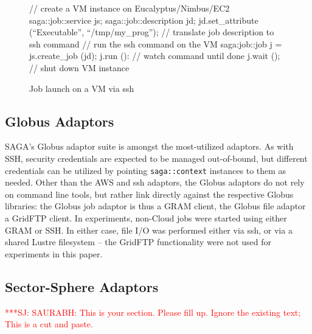 \documentclass[3p,twocolumn]{elsarticle}
\newcommand{\jhanote}[1]{ {\textcolor{red} { ***SJ: #1 }}}
\newcommand{\jhanote}[1]{}
\newcommand{\upp}{\vspace*{-0.6em}}
\newcommand{\T}[1]{\texttt{#1}}
\begin{document}
\begin{figure}[!ht]
\begin{center}
  \begin{mycode}[label=SAGA create a VM instance on a Cloud]
   {// create a VM instance on Eucalyptus/Nimbus/EC2
    saga::job::service     js;
    saga::job::description jd;
    jd.set_attribute (``Executable'', ``/tmp/my_prog'');
    // translate job description to ssh command
    // run the ssh command on the VM
    saga:job::job j = js.create_job (jd);
    j.run ():
    // watch command until done
    j.wait ();
   } // shut down VM instance
  \end{mycode}
  \caption{\label{vmjob} Job launch on a VM via ssh\vspace*{-2em}}
 \end{center}
\upp
\end{figure}

\subsection{Globus Adaptors}
SAGA's Globus adaptor suite is amongst the most-utilized adaptors.  As
with SSH, security credentials are expected to be managed
out-of-bound, but different credentials can be utilized by pointing
\T{saga::context} instances to them as needed.  Other than the AWS and
ssh adaptors, the Globus adaptors do not rely on command line tools,
but rather link directly against the respective Globus libraries: the
Globus job adaptor is thus a GRAM client, the Globus file adaptor a
GridFTP client.  In experiments, non-Cloud jobs were started using
either GRAM or SSH.  In either case, file I/O was performed either via
ssh, or via a shared Lustre filesystem -- the GridFTP functionality
were not used for experiments in this paper.

\subsection{Sector-Sphere Adaptors}

\jhanote{SAURABH: This is your section. Please fill up. Ignore the
  existing text; This is a cut and paste. }
\end{document}
